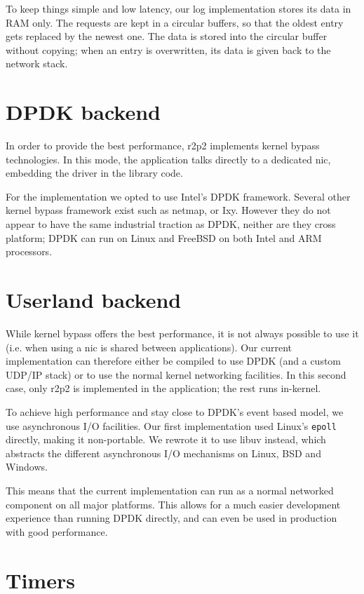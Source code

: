 To keep things simple and low latency, our log implementation stores its data in RAM only.
The requests are kept in a circular buffers, so that the oldest entry gets replaced by the newest one.
The data is stored into the circular buffer without copying; when an entry is overwritten, its data is given back to the network stack.

\section{DPDK backend}

In order to provide the best performance, \gls{r2p2} implements kernel bypass technologies.
In this mode, the application talks directly to a dedicated \gls{nic}, embedding the driver in the library code.

For the implementation we opted to use Intel's DPDK framework.
Several other kernel bypass framework exist such as netmap\cite{netmap}, or Ixy\cite{ixy}.
However they do not appear to have the same industrial traction as DPDK, neither are they cross platform; DPDK can run on Linux and FreeBSD on both Intel and ARM processors.

\section{Userland backend}

While kernel bypass offers the best performance, it is not always possible to use it (i.e. when using a \gls{nic} is shared between applications).
Our current implementation can therefore either be compiled to use DPDK (and a custom UDP/IP stack) or to use the normal kernel networking facilities.
In this second case, only \gls{r2p2} is implemented in the application; the rest runs in-kernel.

To achieve high performance and stay close to DPDK's event based model, we use asynchronous I/O facilities.
Our first implementation used Linux's \texttt{epoll} directly, making it non-portable.
We rewrote it to use libuv instead, which abstracts the different asynchronous I/O mechanisms on Linux, BSD and Windows.

This means that the current implementation can run as a normal networked component on all major platforms.
This allows for a much easier development experience than running DPDK directly, and can even be used in production with good performance.

\section{Timers}

